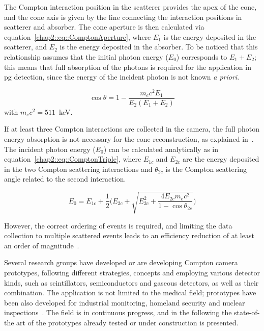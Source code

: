 The Compton interaction position in the scatterer provides the apex of the cone, and the cone axis is given by the line connecting the interaction positions in scatterer and absorber. The cone aperture is then calculated via equation~\ref{chap2::eq::ComptonAperture}, where $E_1$ is the energy deposited in the scatterer, and $E_2$ is the energy deposited in the absorber. To be noticed that this relationship assumes that the initial photon energy ($E_0$) corresponds to $E_1 + E_2$; this means that full absorption of the photons is required for the application in \gls{pg} detection, since the energy of the incident photon is not known \textit{a priori}. 

\begin{equation}
\cos{\theta} = 1 - \frac{m_ec^2E_ 1}{E_2(E_1+E_2)} 
\label{chap2::eq::ComptonAperture}
\end{equation} 
with $m_{e}c^{2} = 511$~keV.

If at least three Compton interactions are collected in the camera, the full photon energy absorption is not necessary for the cone reconstruction, as explained in~\parencite{Kurfess2000}. The incident photon energy ($E_0$) can be calculated analytically as in equation~\ref{chap2::eq::ComptonTriple}, where $E_{1c}$ and $E_{2c}$ are the energy deposited in the two Compton scattering interactions and $\theta_{2c}$ is the Compton scattering angle related to the second interaction. 

\begin{equation}
E_0 = E_{1c} + \frac{1}{2}\bigg(E_{2c} + \sqrt{E_{2c}^2+\frac{4E_{2c}m_ec^2}{1-\cos\theta_{2c}}}\bigg) 
\label{chap2::eq::ComptonTriple}
\end{equation} 

However, the correct ordering of events is required, and limiting the data collection to multiple scattered events leads to an efficiency reduction of at least an order of magnitude~\parencite{Roellinghoff2011}.

Several research groups have developed or are developing Compton camera prototypes, following different strategies, concepts and employing various detector kinds, such as scintillators, semiconductors and gaseous detectors, as well as their combination. The application is not limited to the medical field; prototypes have been also developed for industrial monitoring, homeland security and nuclear inspections~\parencite{Martin1994, McKisson1994}. The field is in continuous progress, and in the following the state-of-the art of the prototypes already tested or under construction is presented.

